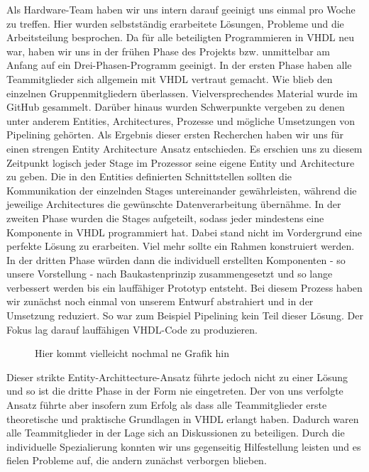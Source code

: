 \documentclass[paper=a4,fontsize=12pt,twocolumn]{scrreprt}
\begin{document}
Als Hardware-Team haben wir uns intern darauf geeinigt uns einmal pro Woche zu treffen.
Hier wurden selbstständig erarbeitete Lösungen, Probleme und die Arbeitsteilung besprochen.
Da für alle beteiligten Programmieren in VHDL neu war, haben wir uns in der frühen Phase des Projekts bzw. unmittelbar am Anfang auf ein Drei-Phasen-Programm geeinigt.
In der ersten Phase haben alle Teammitglieder sich allgemein mit VHDL vertraut gemacht.
Wie blieb den einzelnen Gruppenmitgliedern überlassen.
Vielversprechendes Material wurde im GitHub gesammelt.
Darüber hinaus wurden Schwerpunkte vergeben zu denen unter anderem Entities, Architectures, Prozesse und mögliche Umsetzungen von Pipelining gehörten.
Als Ergebnis dieser ersten Recherchen haben wir uns für einen strengen Entity Architecture Ansatz entschieden.
Es erschien uns zu diesem Zeitpunkt logisch jeder Stage im Prozessor seine eigene Entity und Architecture zu geben.
Die in den Entities definierten Schnittstellen sollten die Kommunikation der einzelnden Stages untereinander gewährleisten, während die jeweilige Architectures die gewünschte Datenverarbeitung übernähme.
In der zweiten Phase wurden die Stages aufgeteilt, sodass jeder mindestens eine Komponente in VHDL programmiert hat.
Dabei stand nicht im Vordergrund eine perfekte Lösung zu erarbeiten.
Viel mehr sollte ein Rahmen konstruiert werden.
In der dritten Phase würden dann die individuell erstellten Komponenten - so unsere Vorstellung - nach Baukastenprinzip zusammengesetzt und so lange verbessert werden bis ein lauffähiger Prototyp entsteht.
Bei diesem Prozess haben wir zunächst noch einmal von unserem Entwurf abstrahiert und in der Umsetzung reduziert.
So war zum Beispiel Pipelining kein Teil dieser Lösung.
Der Fokus lag darauf lauffähigen VHDL-Code zu produzieren.

\begin{figure}
    \centering
    \caption{Hier kommt vielleicht nochmal ne Grafik hin}
    \label{fig:my_label}
\end{figure}

%
%

Dieser strikte Entity-Archittecture-Ansatz führte jedoch nicht zu einer Lösung und so ist die dritte Phase in der Form nie eingetreten.
Der von uns verfolgte Ansatz führte aber insofern zum Erfolg als dass alle Teammitglieder erste theoretische und praktische Grundlagen in VHDL erlangt haben.
Dadurch waren alle Teammitglieder in der Lage sich an Diskussionen zu beteiligen.
Durch die individuelle Spezialierung konnten wir uns gegenseitig Hilfestellung leisten und es fielen Probleme auf, die andern zunächst verborgen blieben.
\end{document}

